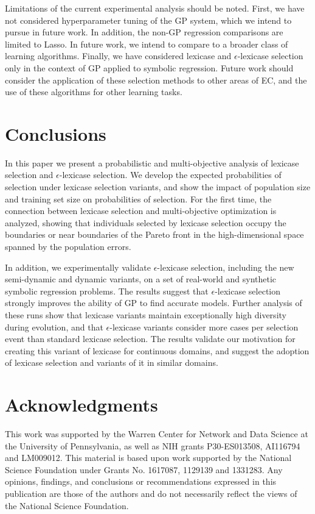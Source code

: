 \documentclass[twoside]{article}
\newcommand{\edit}[1]{{\color{red} #1}}
\begin{document}
\edit{Limitations of the current experimental analysis should be noted. First, we have not considered hyperparameter tuning of the GP system, which we intend to pursue in future work. In addition, the non-GP regression comparisons are limited to Lasso. In future work, we intend to compare to a broader class of learning algorithms. Finally, we have considered lexicase and $\epsilon$-lexicase selection only in the context of GP applied to symbolic regression. Future work should consider the application of these selection methods to other areas of EC, and the use of these algorithms for other learning tasks.}

\section{Conclusions}\label{s:conclusion}
In this paper we present a probabilistic and multi-objective analysis of lexicase selection and $\epsilon$-lexicase selection. We develop the expected probabilities of selection under lexicase selection variants, and show the impact of population size and training set size on probabilities of selection. For the first time, the connection between lexicase selection and multi-objective optimization is analyzed, showing that individuals selected by lexicase selection occupy the boundaries or near boundaries of the Pareto front in the high-dimensional space spanned by the population errors. 

In addition, we experimentally validate $\epsilon$-lexicase selection, including the new semi-dynamic and dynamic variants, on a set of real-world and synthetic symbolic regression problems. The results suggest that $\epsilon$-lexicase selection strongly improves the ability of GP to find accurate models. Further analysis of these runs show that lexicase variants maintain exceptionally high diversity during evolution, and that $\epsilon$-lexicase variants consider more cases per selection event than standard lexicase selection. The results validate our motivation for creating this variant of lexicase for continuous domains, and suggest the adoption of lexicase selection and variants of it in similar domains.  

\section{Acknowledgments}
This work was supported by the Warren Center for Network and Data Science at the University of Pennsylvania, as well as NIH grants P30-ES013508, AI116794 and LM009012. This material is based upon work supported by the National Science Foundation under Grants No. 1617087, 1129139 and 1331283. Any opinions, findings, and conclusions or recommendations expressed in this publication are those of the authors and do not necessarily reflect the views of the National Science Foundation.




\end{document}
